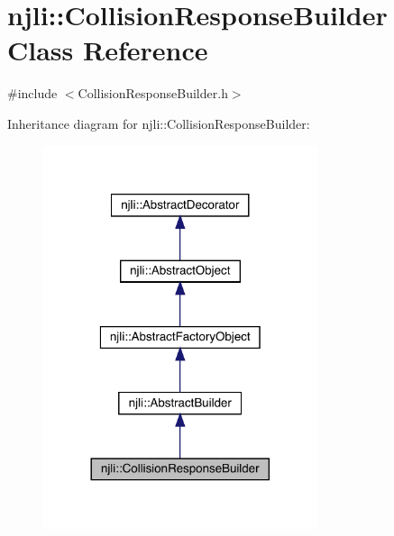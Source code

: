 \hypertarget{classnjli_1_1_collision_response_builder}{}\section{njli\+:\+:Collision\+Response\+Builder Class Reference}
\label{classnjli_1_1_collision_response_builder}


{\ttfamily \#include $<$Collision\+Response\+Builder.\+h$>$}



Inheritance diagram for njli\+:\+:Collision\+Response\+Builder\+:\nopagebreak
\begin{figure}[H]
\begin{center}
\leavevmode
\includegraphics[width=228pt]{classnjli_1_1_collision_response_builder__inherit__graph}
\end{center}
\end{figure}


